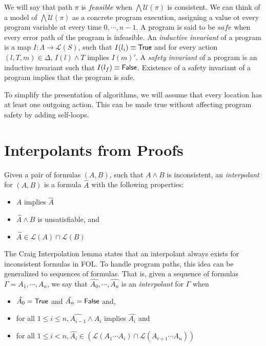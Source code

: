 We will say that path $\pi$ is $feasible$ when $\bigwedge \mathcal{U}(\pi)$ is consistent. We can think of a model of $\bigwedge \mathcal{U}(\pi)$ as a concrete program execution, assigning a value ot every program variable at every time $0, \cdots, n-1$. A program is said to be $safe$ when every error path of the program is infeasible. An \textit{inductive invariant} of a program is a map $I : \Lambda \rightarrow \mathcal{L}(S)$, such that $I(l_i) \equiv \mathsf{True}$ and for every action $(l, T, m) \in \Delta$, $I(l) \wedge T$ implies $I(m)'$. A \textit{safety invariant} of a program is an inductive invariant such that $I(l_f) \equiv \mathsf{False}$. Existence of a safety invariant of a program implies that the program is safe.

To simplify the presentation of algorithms, we will assume that every location has at least one outgoing action. This can be made true without affecting program safety by adding self-loops.

\section{Interpolants from Proofs}
\label{sec:interpolants-from-proofs}

Given a pair of formulas $(A,B)$, such that $A \wedge B$ is inconsistent, an \textit{interpolant} for $(A,B)$ is a formula $\hat{A}$ with the following properties:

\begin{itemize}
  \item $A$ implies $\hat{A}$
  \item $\hat{A} \wedge B$ is unsatisfiable, and
  \item $\hat{A} \in \mathcal{L}(A) \cap \mathcal{L}(B)$
\end{itemize}

The Craig Interpolation lemma \cite{craig1957} states that an interpolant always exists for inconsistent formulas in FOL. To handle program paths, this idea can be generalized to sequences of formulas. That is, given a sequence of formulas $\Gamma = A_1, \cdots , A_n$, we say that $\hat{A_0},\cdots, \hat{A_n}$ is an \textit{interpolant} for $\Gamma$ when

\begin{itemize}
  \item $\hat{A_0} = \mathsf{True}$ and $\hat{A_n} = \mathsf{False}$ and,
  \item for all $1 \leq i \leq n, \hat{A_{i-1}} \wedge A_i$ implies $\hat{A_i}$ and
  \item for all $1 \leq i < n, \hat{A_i} \in (\mathcal{L}(A_1 \cdots A_i) \cap \mathcal{L}(A_{i+1}\cdots A_n))$
\end{itemize}

